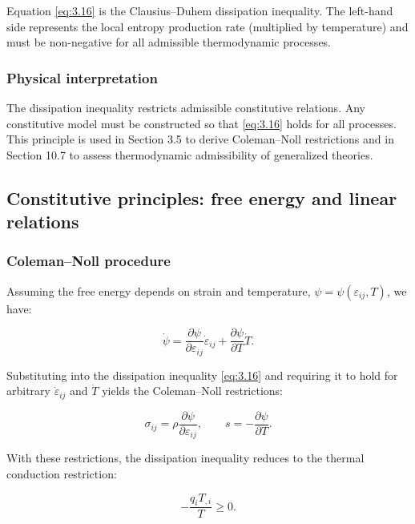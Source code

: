Equation \eqref{eq:3.16} is the Clausius--Duhem dissipation inequality. The left-hand side represents the local entropy production rate (multiplied by temperature) and must be non-negative for all admissible thermodynamic processes.

\subsubsection{Physical interpretation}
The dissipation inequality restricts admissible constitutive relations. Any constitutive model must be constructed so that \eqref{eq:3.16} holds for all processes. This principle is used in Section 3.5 to derive Coleman--Noll restrictions and in Section 10.7 to assess thermodynamic admissibility of generalized theories.

\subsection{Constitutive principles: free energy and linear relations}
\label{sec:3.5}

\subsubsection{Coleman--Noll procedure}

Assuming the free energy depends on strain and temperature, $\psi = \psi(\varepsilon_{ij}, T)$, we have:

\begin{equation}
\dot{\psi} = \frac{\partial\psi}{\partial\varepsilon_{ij}}\dot{\varepsilon}_{ij}
+ \frac{\partial\psi}{\partial T}\dot{T}.
\label{eq:3.17}
\end{equation}

Substituting into the dissipation inequality \eqref{eq:3.16} and requiring it to hold for arbitrary $\dot{\varepsilon}_{ij}$ and $\dot{T}$ yields the Coleman--Noll restrictions:

\begin{equation}
\sigma_{ij} = \rho \frac{\partial\psi}{\partial\varepsilon_{ij}},
\qquad
s = -\frac{\partial\psi}{\partial T}.
\label{eq:3.18}
\end{equation}

With these restrictions, the dissipation inequality reduces to the thermal conduction restriction:

\begin{equation}
-\frac{q_i T_{,i}}{T} \geq 0.
\label{eq:3.19}
\end{equation}

